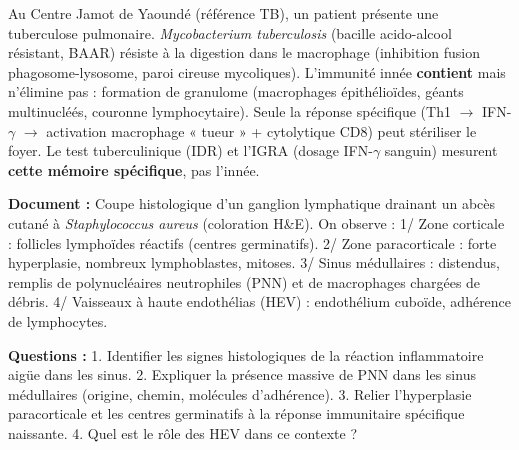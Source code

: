 \documentclass[11pt]{article}
\newcommand{\cle}[1]{{\popxbold\color{popdark}#1}}
\begin{document}
\begin{exemplebox}
Au Centre Jamot de Yaoundé (référence TB), un patient présente une tuberculose pulmonaire. \emph{Mycobacterium tuberculosis} (bacille acido-alcool résistant, BAAR) résiste à la digestion dans le macrophage (inhibition fusion phagosome-lysosome, paroi cireuse mycoliques). L'immunité innée \textbf{contient} mais n'élimine pas : formation de \cle{granulome} (macrophages épithélioïdes, géants multinucléés, couronne lymphocytaire). Seule la réponse spécifique (Th1 $\rightarrow$ IFN-$\gamma$ $\rightarrow$ activation macrophage « tueur » + cytolytique CD8) peut stériliser le foyer. Le test tuberculinique (IDR) et l'IGRA (dosage IFN-$\gamma$ sanguin) mesurent \textbf{cette mémoire spécifique}, pas l'innée.
\end{exemplebox}

\begin{exercice}
\textbf{Document :} Coupe histologique d'un ganglion lymphatique drainant un abcès cutané à \emph{Staphylococcus aureus} (coloration H\&E). On observe : 1/ Zone corticale : follicles lymphoïdes réactifs (centres germinatifs). 2/ Zone paracorticale : forte hyperplasie, nombreux lymphoblastes, mitoses. 3/ Sinus médullaires : distendus, remplis de polynucléaires neutrophiles (PNN) et de macrophages chargées de débris. 4/ Vaisseaux à haute endothélias (HEV) : endothélium cuboïde, adhérence de lymphocytes.

\textbf{Questions :}
1. Identifier les signes histologiques de la réaction inflammatoire aigüe dans les sinus.
2. Expliquer la présence massive de PNN dans les sinus médullaires (origine, chemin, molécules d'adhérence).
3. Relier l'hyperplasie paracorticale et les centres germinatifs à la réponse immunitaire spécifique naissante.
4. Quel est le rôle des HEV dans ce contexte ?
\end{exercice}
\end{document}
